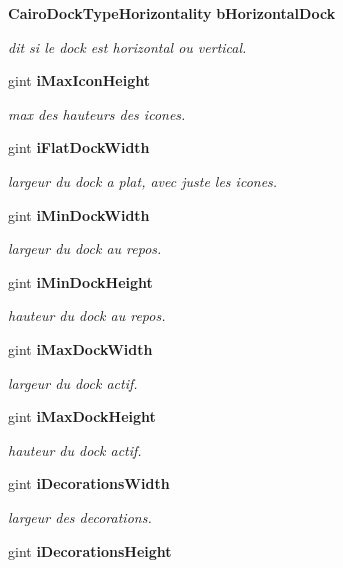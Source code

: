 \begin{CompactItemize}
{\bf CairoDockTypeHorizontality} {\bf bHorizontalDock}
\begin{CompactList}\small\item\em dit si le dock est horizontal ou vertical. \item\end{CompactList}\item 
gint {\bf iMaxIconHeight}
\begin{CompactList}\small\item\em max des hauteurs des icones. \item\end{CompactList}\item 
gint {\bf iFlatDockWidth}
\begin{CompactList}\small\item\em largeur du dock a plat, avec juste les icones. \item\end{CompactList}\item 
gint {\bf iMinDockWidth}
\begin{CompactList}\small\item\em largeur du dock au repos. \item\end{CompactList}\item 
gint {\bf iMinDockHeight}
\begin{CompactList}\small\item\em hauteur du dock au repos. \item\end{CompactList}\item 
gint {\bf iMaxDockWidth}
\begin{CompactList}\small\item\em largeur du dock actif. \item\end{CompactList}\item 
gint {\bf iMaxDockHeight}
\begin{CompactList}\small\item\em hauteur du dock actif. \item\end{CompactList}\item 
gint {\bf iDecorationsWidth}
\begin{CompactList}\small\item\em largeur des decorations. \item\end{CompactList}\item 
gint {\bf iDecorationsHeight}

\end{CompactItemize}
